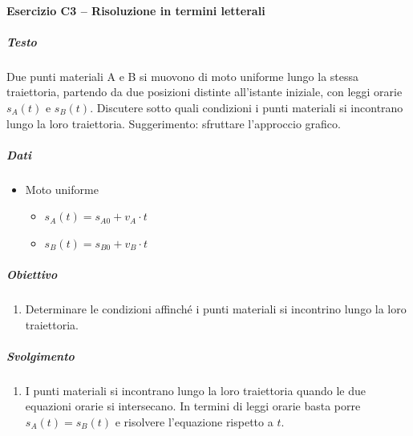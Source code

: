 \documentclass{article}
\begin{document}
\paragraph*{Esercizio C3 – Risoluzione in termini letterali}
\subparagraph*{Testo}
Due punti materiali A e B si muovono di moto uniforme lungo la stessa traiettoria, partendo da due
posizioni distinte all’istante iniziale, con leggi orarie \( s_A(t) \) e \( s_B(t) \). Discutere sotto quali condizioni i punti
materiali si incontrano lungo la loro traiettoria. Suggerimento: sfruttare l’approccio grafico.
\subparagraph*{Dati}
\begin{itemize}
    \item Moto uniforme
          \begin{itemize}
              \item $s_A(t) = s_{A0} + v_A \cdot t$
              \item $s_B(t) = s_{B0} + v_B \cdot t$
          \end{itemize}
\end{itemize}
\subparagraph*{Obiettivo}
\begin{enumerate}[label=\alph*)]
    \item Determinare le condizioni affinché i punti materiali si incontrino lungo la loro traiettoria.
\end{enumerate}

\subparagraph*{Svolgimento}
\begin{enumerate}[label=\alph*)]
    \item I punti materiali si incontrano lungo la loro traiettoria quando le due equazioni orarie si intersecano.
          In termini di leggi orarie basta porre $s_A(t) = s_B(t)$ e risolvere l'equazione rispetto a $t$.
\end{enumerate}
\end{document}
